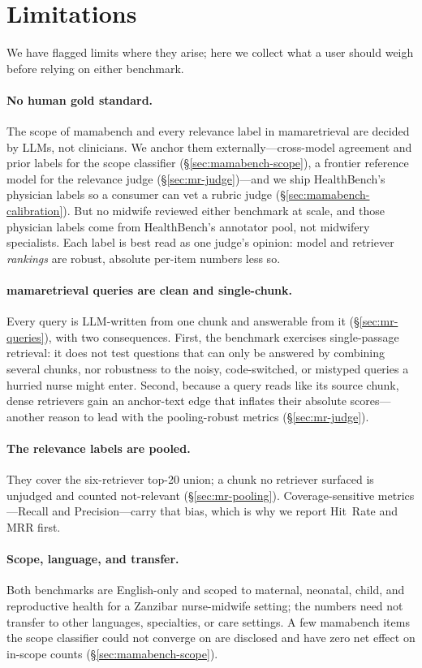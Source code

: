 \section{Limitations}
\label{sec:limitations}

We have flagged limits where they arise; here we collect what a user should weigh
before relying on either benchmark.

\paragraph{No human gold standard.}
The scope of mamabench and every relevance label in mamaretrieval are decided by
LLMs, not clinicians. We anchor them externally---cross-model agreement and prior
labels for the scope classifier (\S\ref{sec:mamabench-scope}), a frontier
reference model for the relevance judge (\S\ref{sec:mr-judge})---and we ship
HealthBench's physician labels so a consumer can vet a rubric judge
(\S\ref{sec:mamabench-calibration}). But no midwife reviewed either benchmark at
scale, and those physician labels come from HealthBench's annotator pool, not
midwifery specialists. Each label is best read as one judge's opinion: model
and retriever \emph{rankings} are robust, absolute per-item numbers less so.

\paragraph{mamaretrieval queries are clean and single-chunk.}
Every query is LLM-written from one chunk and answerable from it
(\S\ref{sec:mr-queries}), with two consequences. First, the benchmark exercises
single-passage retrieval: it does not test questions that can only be answered by
combining several chunks, nor robustness to the noisy, code-switched, or mistyped
queries a hurried nurse might enter. Second, because a query reads like its
source chunk, dense retrievers gain an anchor-text edge that inflates their
absolute scores---another reason to lead with the pooling-robust metrics
(\S\ref{sec:mr-judge}).

\paragraph{The relevance labels are pooled.}
They cover the six-retriever top-20 union; a chunk no retriever surfaced is
unjudged and counted not-relevant (\S\ref{sec:mr-pooling}). Coverage-sensitive
metrics---Recall and Precision---carry that bias, which is why we report
Hit~Rate and MRR first.

\paragraph{Scope, language, and transfer.}
Both benchmarks are English-only and scoped to maternal, neonatal, child, and
reproductive health for a Zanzibar nurse-midwife setting; the numbers need not
transfer to other languages, specialties, or care settings. A few mamabench items
the scope classifier could not converge on are disclosed and have zero net effect
on in-scope counts (\S\ref{sec:mamabench-scope}).
